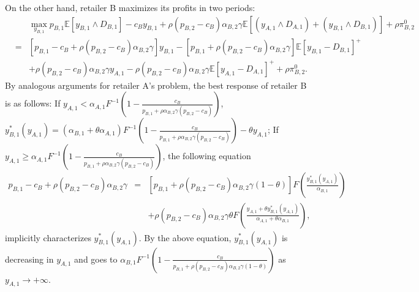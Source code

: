 \documentclass[nonblindrev,copyedit]{informs1}
\begin{document}
\begin{APPENDICES}
On the other hand, retailer B maximizes its profits in two periods:
\begin{eqnarray}
    & & \max_{y_{B,1}}
    p_{B,1} \mathbb{E}\left[y_{B,1} \wedge D_{B,1}  \right] - c_B y_{B,1} + \rho (p_{B,2} -c_B)\alpha_{B,2} \gamma \mathbb{E} \left[(y_{A,1} \wedge D_{A,1}) + (y_{B,1} \wedge D_{B,1})  \right] + \rho \pi^{0}_{B,2} \nonumber \\
    & = & [p_{B,1} -c_B + \rho (p_{B,2} -c_B)\alpha_{B,2}\gamma]y_{B,1} - [p_{B,1}+\rho (p_{B,2} -c_B)\alpha_{B,2}\gamma] \mathbb{E} \left[y_{B,1} - D_{B,1}  \right]^+ \nonumber \\
    & & + \rho (p_{B,2} -c_B)\alpha_{B,2} \gamma y_{A,1} - \rho (p_{B,2} -c_B)\alpha_{B,2} \gamma \mathbb{E} \left[y_{A,1} - D_{A,1}  \right]^+ + \rho \pi^{0}_{B,2}. \label{modeln:B1}
\end{eqnarray}
By analogous arguments for retailer A's problem, the best response of retailer B is as follows: If $y_{A,1} < \alpha_{A,1} F^{-1}\left( 1- \frac{c_B}{p_{B,1} + \rho \alpha_{B,2} \gamma (p_{B,2} -c_B)} \right)$, $y_{B,1}^*(y_{A,1}) = (\alpha_{B,1} + \theta \alpha_{A,1}) F^{-1}\left( 1- \frac{c_B}{p_{B,1} + \rho \alpha_{B,2} \gamma (p_{B,2} -c_B)} \right) - \theta y_{A,1}$; If $y_{A,1} \geq \alpha_{A,1} F^{-1}\left( 1- \frac{c_B}{p_{B,1} + \rho \alpha_{B,2} \gamma (p_{B,2} -c_B)} \right)$, the following equation
\begin{eqnarray}
    p_{B,1} -c_B + \rho (p_{B,2} -c_B) \alpha_{B,2} \gamma & = & [p_{B,1} + \rho (p_{B,2} -c_B)\alpha_{B,2} \gamma(1-\theta)] F\left(\frac{y_{B,1}^*(y_{A,1})}{\alpha_{B,1}} \right) \nonumber \\
    & &+ \rho (p_{B,2} -c_B)\alpha_{B,2} \gamma \theta F \left(\frac{y_{A,1} + \theta y_{B,1}^*(y_{A,1})}{\alpha_{A,1}+\theta \alpha_{B,1}} \right), \label{modeln:BRB1-2}
\end{eqnarray}
implicitly characterizes $y_{B,1}^*(y_{A,1})$. By the above equation, $y_{B,1}^*(y_{A,1})$ is decreasing in $y_{A,1}$ and goes to $\alpha_{B,1} F^{-1} \left(1 - \frac{c_B}{p_{B,1}+\rho(p_{B,2}-c_B)\alpha_{B,2}\gamma(1-\theta)} \right)$ as $y_{A,1} \rightarrow +\infty$.


\end{APPENDICES}
\end{document}
